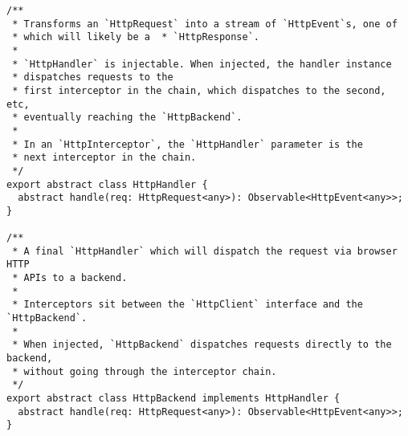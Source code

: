 \begin{verbatim}
/**
 * Transforms an `HttpRequest` into a stream of `HttpEvent`s, one of
 * which will likely be a  * `HttpResponse`.
 *
 * `HttpHandler` is injectable. When injected, the handler instance
 * dispatches requests to the
 * first interceptor in the chain, which dispatches to the second, etc,
 * eventually reaching the `HttpBackend`.
 *
 * In an `HttpInterceptor`, the `HttpHandler` parameter is the
 * next interceptor in the chain.
 */
export abstract class HttpHandler {
  abstract handle(req: HttpRequest<any>): Observable<HttpEvent<any>>;
}

/**
 * A final `HttpHandler` which will dispatch the request via browser HTTP
 * APIs to a backend.
 *
 * Interceptors sit between the `HttpClient` interface and the `HttpBackend`.
 *
 * When injected, `HttpBackend` dispatches requests directly to the backend,
 * without going through the interceptor chain.
 */
export abstract class HttpBackend implements HttpHandler {
  abstract handle(req: HttpRequest<any>): Observable<HttpEvent<any>>;
}
\end{verbatim}
